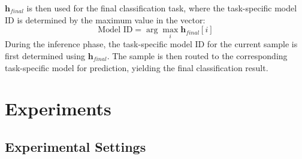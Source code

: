 \documentclass[11pt]{article}
\begin{document}
$\mathbf{h}_{final}$ is then used for the final classification task, where the task-specific model ID is determined by the maximum value in the vector:
\begin{equation}
    \text{Model ID} = \arg\max_i \mathbf{h}_{final}[i]
\end{equation}
During the inference phase, the task-specific model ID for the current sample is first determined using $\mathbf{h}_{final}$. The sample is then routed to the corresponding task-specific model for prediction, yielding the final classification result.




\section{Experiments}


\subsection{Experimental Settings}
\end{document}
